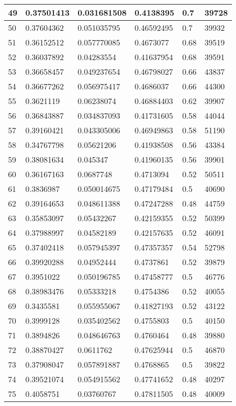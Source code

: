 \begin{longtable}{|l|l|l|l|l|l|}
49 & 0.37501413 & 0.031681508 & 0.4138395 & 0.7 & 39728 \\ \hline 
50 & 0.37604362 & 0.051035795 & 0.46592495 & 0.7 & 39932 \\ \hline 
51 & 0.36152512 & 0.057770085 & 0.4673077 & 0.68 & 39519 \\ \hline 
52 & 0.36037892 & 0.04283554 & 0.41637954 & 0.68 & 39591 \\ \hline 
53 & 0.36658457 & 0.049237654 & 0.46798027 & 0.66 & 43837 \\ \hline 
54 & 0.36677262 & 0.056975417 & 0.4686037 & 0.66 & 44300 \\ \hline 
55 & 0.3621119 & 0.06238074 & 0.46884403 & 0.62 & 39907 \\ \hline 
56 & 0.36843887 & 0.034837093 & 0.41731605 & 0.58 & 44044 \\ \hline 
57 & 0.39160421 & 0.043305006 & 0.46949863 & 0.58 & 51190 \\ \hline 
58 & 0.34767798 & 0.05621206 & 0.41938508 & 0.56 & 43384 \\ \hline 
59 & 0.38081634 & 0.045347 & 0.41960135 & 0.56 & 39901 \\ \hline 
60 & 0.36167163 & 0.0687748 & 0.4713094 & 0.52 & 50511 \\ \hline 
61 & 0.3836987 & 0.050014675 & 0.47179484 & 0.5 & 40690 \\ \hline 
62 & 0.39164653 & 0.048611388 & 0.47247288 & 0.48 & 44759 \\ \hline 
63 & 0.35853097 & 0.05432267 & 0.42159355 & 0.52 & 50399 \\ \hline 
64 & 0.37988997 & 0.04582189 & 0.42157635 & 0.52 & 46091 \\ \hline 
65 & 0.37402418 & 0.057945397 & 0.47357357 & 0.54 & 52798 \\ \hline 
66 & 0.39920288 & 0.04952444 & 0.4737861 & 0.52 & 39879 \\ \hline 
67 & 0.3951022 & 0.050196785 & 0.47458777 & 0.5 & 46776 \\ \hline 
68 & 0.38983476 & 0.05333218 & 0.4754386 & 0.52 & 40055 \\ \hline 
69 & 0.3435581 & 0.055955067 & 0.41827193 & 0.52 & 43122 \\ \hline 
70 & 0.3999128 & 0.035402562 & 0.4755803 & 0.5 & 40150 \\ \hline 
71 & 0.3894826 & 0.048646763 & 0.4760464 & 0.48 & 39880 \\ \hline 
72 & 0.38870427 & 0.0611762 & 0.47625944 & 0.5 & 46870 \\ \hline 
73 & 0.37908047 & 0.057891887 & 0.4768865 & 0.5 & 39822 \\ \hline 
74 & 0.39521074 & 0.054915562 & 0.47741652 & 0.48 & 40297 \\ \hline 
75 & 0.4058751 & 0.03760767 & 0.47811505 & 0.48 & 40009 \\ \hline 
\end{longtable}